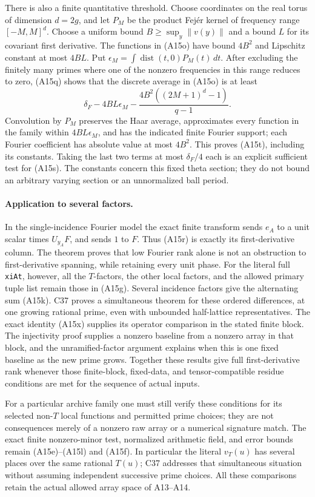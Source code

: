 There is also a finite quantitative threshold.  Choose coordinates
on the real torus of dimension $d=2g$, and let $P_M$ be the product
Fej\'er kernel of frequency range $[-M,M]^d$.  Choose a uniform
bound $B\ge\sup_y\|v(y)\|$ and a bound $L$ for its covariant first
derivative.  The functions in (A15o) have bound $4B^2$ and
Lipschitz constant at most $4BL$.  Put
$\epsilon_M=\int\operatorname{dist}(t,0)P_M(t)\,dt$.
After excluding the finitely many primes where one of the nonzero
frequencies in this range reduces to zero, (A15q) shows that the
discrete average in (A15o) is at least
\[
 \delta_F-4BL\epsilon_M
       -\frac{4B^2((2M+1)^d-1)}{q-1}.
 \tag{A15t}
\]
Convolution by $P_M$ preserves the Haar average, approximates every
function in the family within $4BL\epsilon_M$, and has the
indicated finite Fourier support; each Fourier coefficient has
absolute value at most $4B^2$.  This proves (A15t), including its
constants.  Taking the last two terms at most $\delta_F/4$ each
is an explicit sufficient test for (A15s).  The constants concern
this fixed theta section; they do not bound an arbitrary varying
section or an unnormalized ball period.

\paragraph{Application to several factors.}
In the single-incidence Fourier model the exact finite transform
sends $e_A$ to a unit scalar times $U_{y_A}F$, and sends $1$ to
$F$.  Thus (A15r) is exactly its first-derivative column.  The
theorem proves that low Fourier rank alone is not an obstruction
to first-derivative spanning, while retaining every unit phase.
For the literal full \texttt{xiAt}, however, all the $T$-factors,
the other local factors, and the allowed primary tuple list remain
those in (A15g).  Several incidence factors give the alternating
sum (A15k).  C37 proves a simultaneous theorem for these ordered
differences, at one growing rational prime, even with unbounded
half-lattice representatives.  The exact identity (A15x) supplies
its operator comparison in the stated finite block.  The
injectivity proof supplies a nonzero baseline from a nonzero
array in that block, and the unramified-factor argument explains
when this is one fixed baseline as the new prime grows.
Together these results give full first-derivative rank whenever
those finite-block, fixed-data, and tensor-compatible residue
conditions are met for the sequence of actual inputs.

For a particular archive family one must still verify these
conditions for its selected non-$T$ local functions and permitted
prime choices; they are not consequences merely of a nonzero raw
array or a numerical signature match.  The exact finite
nonzero-minor test, normalized arithmetic field, and error bounds
remain (A15e)--(A15l) and (A15f).  In particular the literal
$v_T(u)$ has several places over the same rational $T(u)$;
C37 addresses that simultaneous situation without assuming
independent successive prime choices.  All these comparisons
retain the actual allowed array space of A13--A14.

